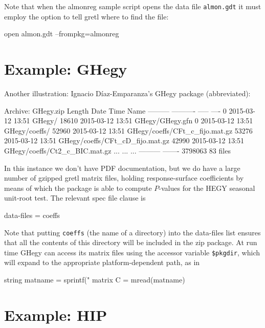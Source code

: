 \documentclass[oneside]{book}
\begin{document}
Note that when the \textsf{almonreg} sample script opens the data file
\texttt{almon.gdt} it must employ the  option to tell
gretl where to find the file:

\begin{code}
open almon.gdt --frompkg=almonreg
\end{code}

\section{Example: \textsf{GHegy}}

Another illustration: Ignacio D\'iaz-Emparanza's \textsf{GHegy}
package (abbreviated):
%
\begin{code}
Archive:  GHegy.zip
  Length      Date    Time    Name
---------  ---------- -----   ----
        0  2015-03-12 13:51   GHegy/
    18610  2015-03-12 13:51   GHegy/GHegy.gfn
        0  2015-03-12 13:51   GHegy/coeffs/
    52960  2015-03-12 13:51   GHegy/coeffs/CFt_c_fijo.mat.gz
    53276  2015-03-12 13:51   GHegy/coeffs/CFt_cD_fijo.mat.gz
    42990  2015-03-12 13:51   GHegy/coeffs/Ct2_c_BIC.mat.gz
    ...    ...                ...
---------                     -------
  3798063                     83 files
\end{code}

In this instance we don't have PDF documentation, but we do have a
large number of gzipped gretl matrix files, holding response-surface
coefficients by means of which the package is able to compute
$P$-values for the HEGY seasonal unit-root test. The relevant
spec file clause is
%
\begin{code}
data-files = coeffs
\end{code}
%
Note that putting \texttt{coeffs} (the name of a directory) into the
data-files list ensures that all the contents of this directory will
be included in the zip package. At run time \textsf{GHegy} can access
its matrix files using the accessor variable
\verb|$pkgdir|, which will expand to the appropriate
platform-dependent path, as in
%
\begin{code}
string matname = sprintf("%
matrix C = mread(matname)
\end{code}

\section{Example: \textsf{HIP}}
\label{sec:HIP}
\end{document}

